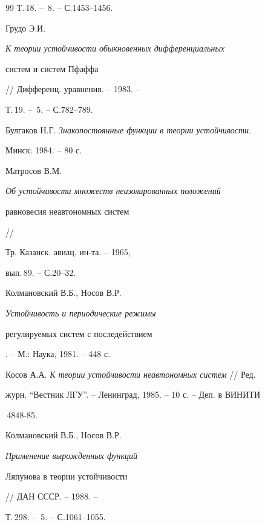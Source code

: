 \begin{thebibliography}{99}
Т.\,18. -- \No\,8. -- С.1453--1456. 


 




Грудо Э.И. {\em К теории устойчивости обыкновенных дифференциальных 


систем и систем Пфаффа} // Дифференц. уравнения. -- 1983. -- 


Т.\,19. -- \No\,5. -- С.782--789. 


 




Булгаков Н.Г. {\em Знакопостоянные функции в теории устойчивости}. 


Минск: 1984. -- 80 с. 


 




Матросов В.М. {\em Об устойчивости множеств неизолированных положений 


равновесия неавтономных систем} //


Тр. Казанск. авиац. ин-та. -- 1965,


вып.\,89. -- С.20--32. 


 




Колмановский В.Б., Носов В.Р. {\em Устойчивость и периодические режимы 


регулируемых систем с последействием}. -- М.: Наука, 1981. -- 448 с. 


 




Косов А.А. {\em К теории устойчивости неавтономных систем} // Ред. 


журн. ``Вестник ЛГУ''. -- Ленинград, 1985. -- 10 с. -- Деп. в ВИНИТИ


\No\,4848-85.


 




Колмановский В.Б., Носов В.Р. {\em Применение вырожденных функций 


Ляпунова в теории устойчивости} // ДАН СССР. -- 1988. -- 


Т.\,298. -- \No\,5. -- С.1061--1055. 


 



\end{thebibliography}
